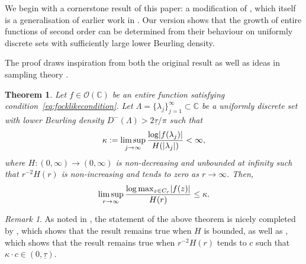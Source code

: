 \documentclass{article}
\newcommand{\bbC}{\mathbb{C}}
\newcommand{\calO}{\mathcal{O}}
\DeclarePairedDelimiter{\abs}{\lvert}{\rvert}
\newtheorem{theorem}{Theorem}
\theoremstyle{remark}
\newtheorem{remark}{Remark}
\begin{document}
    We begin with a cornerstone result of this paper: a modification of \cite[Theorem~2 on p.~724]{Earl1966On}, which itself is a generalisation of earlier work in \cite{Cartwright1938On,Pfluger1937On}. Our version shows that the growth of entire functions of second order can be determined from their behaviour on uniformly discrete sets with sufficiently large lower Beurling density. 

    The proof draws inspiration from both the original result as well as ideas in sampling theory \cite{Beurling1989Harmonic,Seip1992DensityI,Seip1992DensityII}.

    \begin{theorem}\label{thm:Earl}
        Let $f \in \calO(\bbC)$ be an entire function satisfying condition~\eqref{eq:focklikecondition}. Let $\Lambda = \lbrace \lambda_j \rbrace_{j = 1}^\infty \subset \bbC$ be a uniformly discrete set with lower Beurling density $D^{-}(\Lambda) > 2 \underline \tau / \pi$ such that 
        \begin{equation*}
            \kappa := \limsup_{j \to \infty} \frac{\log \abs{f(\lambda_j)}}{H(\abs{\lambda_j})} < \infty,
        \end{equation*}
        where $H : (0,\infty) \to (0,\infty)$ is non-decreasing and unbounded at infinity such that $r^{-2} H(r)$ is non-increasing and tends to zero as $r \to \infty$. Then, 
        \begin{equation*}
            \limsup_{r \to \infty} \frac{\log \max_{z \in C_r} \abs{f(z)}}{H(r)} \leq \kappa.
        \end{equation*}
    \end{theorem}

    \begin{remark}
        As noted in \cite{Earl1966On}, the statement of the above theorem is nicely completed by \cite[Satz~4 on p.~202--203]{Pfluger1945Ueber}, which shows that the result remains true when $H$ is bounded, as well as \cite[Corollary~3 on p.~716]{Noble1951Nonmeasurable}, which shows that the result remains true when $r^{-2} H(r)$ tends to $c$ such that $\kappa \cdot c \in (0,\underline \tau)$.
    \end{remark}
\end{document}
